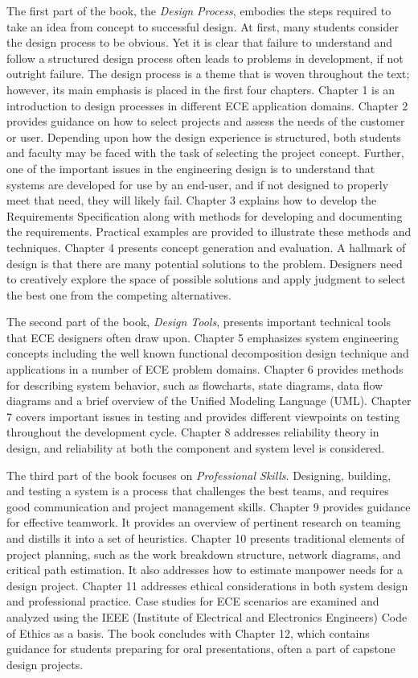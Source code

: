 The first part of the book, the \emph{Design Process}, embodies the
steps required to take an idea from concept to successful design. At
first, many students consider the design process to be obvious. Yet it
is clear that failure to understand and follow a structured design
process often leads to problems in development, if not outright failure.
The design process is a theme that is woven throughout the text;
however, its main emphasis is placed in the first four chapters. Chapter
1 is an introduction to design processes in different ECE application
domains. Chapter 2 provides guidance on how to select projects and
assess the needs of the customer or user. Depending upon how the design
experience is structured, both students and faculty may be faced with
the task of selecting the project concept. Further, one of the important
issues in the engineering design is to understand that systems are
developed for use by an end-user, and if not designed to properly meet
that need, they will likely fail. Chapter 3 explains how to develop the
Requirements Specification along with methods for developing and
documenting the requirements. Practical examples are provided to
illustrate these methods and techniques. Chapter 4 presents concept
generation and evaluation. A hallmark of design is that there are many
potential solutions to the problem. Designers need to creatively explore
the space of possible solutions and apply judgment to select the best
one from the competing alternatives.

The second part of the book, \emph{Design Tools}, presents important
technical tools that ECE designers often draw upon. Chapter 5 emphasizes
system engineering concepts including the well known functional
decomposition design technique and applications in a number of ECE
problem domains. Chapter 6 provides methods for describing system
behavior, such as flowcharts, state diagrams, data flow diagrams and a
brief overview of the Unified Modeling Language (UML). Chapter 7 covers
important issues in testing and provides different viewpoints on testing
throughout the development cycle. Chapter 8 addresses reliability theory
in design, and reliability at both the component and system level is
considered.

The third part of the book focuses on \emph{Professional Skills}.
Designing, building, and testing a system is a process that challenges
the best teams, and requires good communication and project management
skills. Chapter 9 provides guidance for effective teamwork. It provides
an overview of pertinent research on teaming and distills it into a set
of heuristics. Chapter 10 presents traditional elements of project
planning, such as the work breakdown structure, network diagrams, and
critical path estimation. It also addresses how to estimate manpower
needs for a design project. Chapter 11 addresses ethical considerations
in both system design and professional practice. Case studies for ECE
scenarios are examined and analyzed using the IEEE (Institute of
Electrical and Electronics Engineers) Code of Ethics as a basis. The
book concludes with Chapter 12, which contains guidance for students
preparing for oral presentations, often a part of capstone design
projects.

